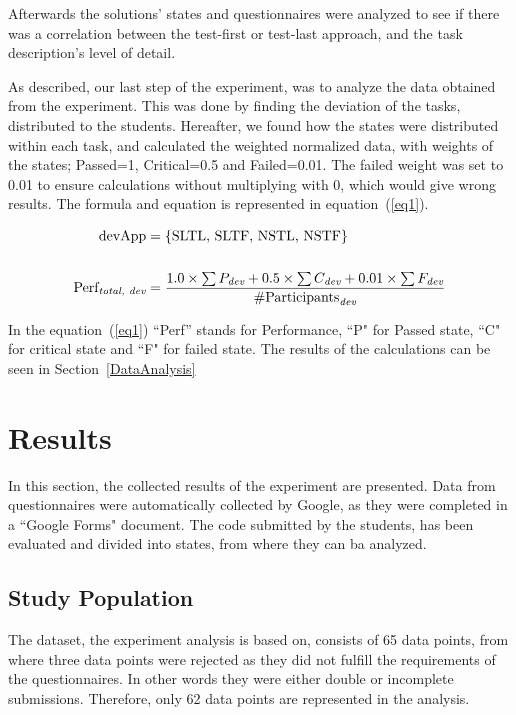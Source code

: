 \documentclass{sig-alternate-05-2015}
\begin{document}
Afterwards the solutions' states and questionnaires were analyzed to see if there was a correlation between the test-first or test-last approach, and the task description's level of detail.

As described, our last step of the experiment, was to ana\-lyze the data obtained from the experiment. This was done by finding the deviation of the tasks, distributed to the students. Hereafter, we found how the states were distributed within each task, and calculated the weighted normalized data, with weights of the states; Passed=1, Critical=0.5 and Failed=0.01. The failed weight was set to 0.01 to ensure calculations without multiplying with 0, which would give wrong results.
The formula and equation is represented in equation~(\ref{eq1}).

\begin{equation}\label{eq1}
\begin{split}
\text{devApp} &= \{\text{SLTL, SLTF, NSTL, NSTF}\} \\
& \\
\text{Perf}_{\emph{total, dev}} &= \dfrac{1.0\times \sum{P_{\emph{dev}}}+0.5\times \sum {C_{\emph{dev}}}+0.01\times \sum{ F_{\emph{dev}}}}{\# \text{Participants}_{\emph{dev}}}
\end{split}
\end{equation}

In the equation~(\ref{eq1}) ``Perf'' stands for Performance, ``P" for Passed state, ``C" for critical state and ``F" for failed state. 
The results of the calculations can be seen in Section~\ref{DataAnalysis}

\section{Results}
\label{sec:Results}
In this section, the collected results of the experiment are presented. Data from questionnaires were automatically collected by Google, as they were completed in a ``Google Forms" document. The code submitted by the students, has been evaluated and divided into states, from where they can ba analyzed.

\subsection{Study Population}
\label{DemograpichInformation}
The dataset, the experiment analysis is based on, consists of 65 data points, from where three data points were rejected as they did not fulfill the requirements of the questionnaires. In other words they were either double or incomplete submissions. Therefore, only 62 data points are represented in the analysis.
\end{document}
